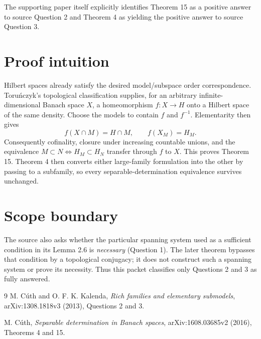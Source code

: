 \documentclass[11pt]{article}
\begin{document}
The supporting paper itself explicitly identifies Theorem 15 as a positive answer to source Question 2 and Theorem 4 as yielding the positive answer to source Question 3.

\section*{Proof intuition}
Hilbert spaces already satisfy the desired model/subspace order correspondence.  Toru\'nczyk's topological classification supplies, for an arbitrary infinite-dimensional Banach space $X$, a homeomorphism $f:X\to H$ onto a Hilbert space of the same density.  Choose the models to contain $f$ and $f^{-1}$.  Elementarity then gives
\[
 f(X\cap M)=H\cap M,
 \qquad f(X_M)=H_M.
\]
Consequently cofinality, closure under increasing countable unions, and the equivalence
$M\subset N\Longleftrightarrow H_M\subset H_N$ transfer through $f$ to $X$.  This proves Theorem 15.  Theorem 4 then converts either large-family formulation into the other by passing to a subfamily, so every separable-determination equivalence survives unchanged.

\section*{Scope boundary}
The source also asks whether the particular spanning system used as a sufficient condition in its Lemma 2.6 is \emph{necessary} (Question 1).  The later theorem bypasses that condition by a topological conjugacy; it does not construct such a spanning system or prove its necessity.  Thus this packet classifies only Questions 2 and 3 as fully answered.

{\raggedright
\begin{thebibliography}{9}
M. C\'uth and O. F. K. Kalenda,
\emph{Rich families and elementary submodels},
arXiv:1308.1818v3 (2013), Questions 2 and 3.

M. C\'uth,
\emph{Separable determination in Banach spaces},
arXiv:1608.03685v2 (2016), Theorems 4 and 15.
\end{thebibliography}
\par}
\end{document}
